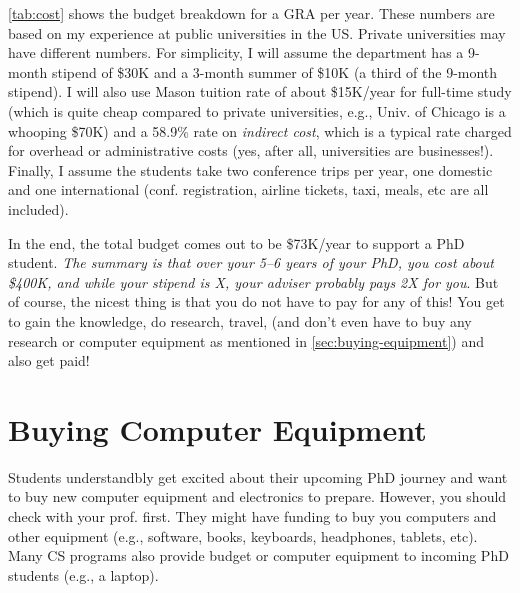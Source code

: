 \documentclass[oneside,11pt,dvipsnames]{book}
\newcommand{\mycomment}[3][\color{blue}]{{#1{{#2}: {#3}}}}
\newcommand{\tvn}[1]{\mycomment{TVN}{#1}}{}
\begin{document}
\autoref{tab:cost} shows the budget breakdown for a GRA per year.
These numbers are based on my experience at public universities in the US. Private universities may have different numbers.  For simplicity, I will assume the department has a 9-month stipend of \$30K and a 3-month summer of \$10K (a third of the 9-month stipend). I will also use Mason tuition rate of about \$15K/year for full-time study (which is quite cheap compared to private universities, e.g., Univ. of Chicago is a whooping \$70K) and a 58.9\% rate on \emph{indirect cost}, which is a typical rate charged for overhead or administrative costs (yes, after all, universities are businesses!).  Finally, I assume the students take two conference trips per year, one domestic and one international (conf. registration, airline tickets, taxi, meals, etc are all included).

In the end, the total budget comes out to be \$73K/year to support a PhD student. \emph{The summary is that over your 5--6 years of your PhD, you cost about \$400K, and while your stipend is X, your adviser probably pays 2X for you}. But of course, the nicest thing is that you do not have to pay for any of this! You get to gain the knowledge, do research, travel, (and don't even have to buy any research or computer equipment as mentioned in \autoref{sec:buying-equipment}) and also get paid!




\section{Buying Computer Equipment}\label{sec:buying-equipment}

Students understandbly get excited about their upcoming PhD journey and want to buy new computer equipment and electronics to prepare. However, you should check with your prof. first.  They might have funding to buy you computers and other equipment (e.g., software, books, keyboards, headphones, tablets, etc). Many CS programs also provide budget or computer equipment to incoming PhD students (e.g., a laptop).
\end{document}

